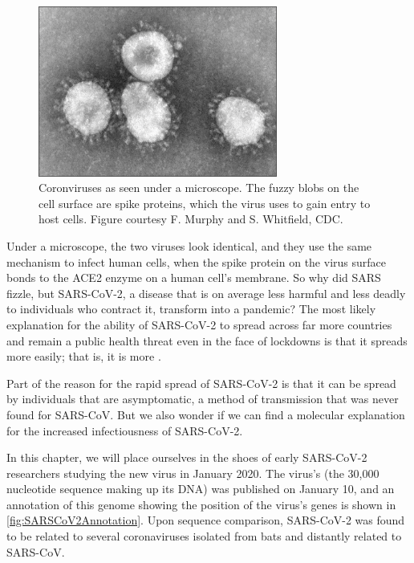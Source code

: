 \begin{figure}[h]
	\centering
	\mySfFamily
	\includegraphics[width = 0.7\textwidth]{../images/coronavirus.png}
	\caption{Coronviruses as seen under a microscope. The fuzzy blobs on the cell surface are spike proteins, which the virus uses to gain entry to host cells. Figure courtesy F. Murphy and S. Whitfield, CDC.}
	\label{fig:coronavirus}
\end{figure}

Under a microscope, the two viruses look identical, and they use the same mechanism to infect human cells, when the spike protein on the virus surface bonds to the ACE2 enzyme on a human cell's membrane. So why did SARS fizzle, but SARS-CoV-2, a disease that is on average less harmful and less deadly to individuals who contract it, transform into a pandemic? The most likely explanation for the ability of SARS-CoV-2 to spread across far more countries and remain a public health threat even in the face of lockdowns is that it spreads more easily; that is, it is more .

Part of the reason for the rapid spread of SARS-CoV-2 is that it can be spread by individuals that are asymptomatic, a method of transmission that was never found for SARS-CoV. But we also wonder if we can find a molecular explanation for the increased infectiousness of SARS-CoV-2.

In this chapter, we will place ourselves in the shoes of early SARS-CoV-2 researchers studying the new virus in January 2020. The virus's  (the 30,000 nucleotide sequence making up its DNA) was published on January 10, and an annotation of this genome showing the position of the virus's genes is shown in \autoref{fig:SARSCoV2Annotation}. Upon sequence comparison, SARS-CoV-2 was found to be related to several coronaviruses isolated from bats and distantly related to SARS-CoV.

